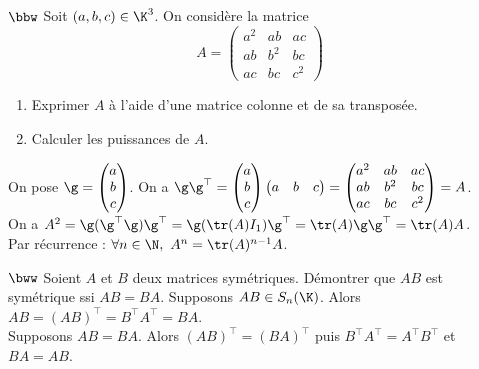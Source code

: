 \documentclass[11pt]{article}
\begin{document}
\begin{exercice}{$\bbw$}{}
    Soit $(a,b,c)\in\K^3$. On considère la matrice
    \begin{equation*}
        A=\begin{pmatrix}
            a^2&ab&ac\\ab&b^2&bc\\ac&bc&c^2
        \end{pmatrix}
    \end{equation*}
    \begin{enumerate}
        \item Exprimer $A$ à l'aide d'une matrice colonne et de sa transposée.
        \item Calculer les puissances de $A$.
    \end{enumerate}
    \tcblower
     On pose $\g = \begin{pmatrix}a\\b\\c\end{pmatrix}$. On a $\g\g^\top=\begin{pmatrix}a\\b\\c\end{pmatrix}\begin{pmatrix}a&b&c\end{pmatrix}=\begin{pmatrix}a^2&ab&ac\\ab&b^2&bc\\ac&bc&c^2\end{pmatrix}=A$.\\
     On a $A^2=\g(\g^\top\g)\g^\top=\g(\tr(A)I_1)\g^\top=\tr(A)\g\g^\top=\tr(A)A$.\\
    Par récurrence : $\forall n \in \N, ~ A^n=\tr(A)^{n-1}A$.  
\end{exercice}

\pagebreak

\begin{exercice}{$\bww$}{}
    Soient $A$ et $B$ deux matrices symétriques. Démontrer que $AB$ est symétrique ssi $AB=BA$.
    \tcblower
    \boxed{\ra} Supposons $AB\in S_n(\K)$. Alors $AB=(AB)^\top=B^\top A^\top=BA$.\\
    \boxed{\la} Supposons $AB=BA$. Alors $(AB)^\top=(BA)^\top$ puis $B^\top A^\top=A^\top B^\top$ et $BA=AB$.
\end{exercice}
\end{document}
